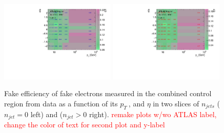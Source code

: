 \begin{figure}[htb]
        \begin{center}
        \includegraphics[width = 0.49\textwidth]{figures/Analysis/Background/njet0_FakeEfficiency3D_el_pt_eta.pdf}
        \includegraphics[width = 0.49\textwidth]{figures/Analysis/Background/njet1_FakeEfficiency3D_el_pt_eta.pdf} 
        \end{center}
    \caption{Fake efficiency of fake electrons measured in the combined control region from data as a function of its $p_{T}~$, and $\eta$ in two slices of $n_{jets}$ ($n_{jet} = 0$ left) and ($n_{jet} > 0$ right). \textcolor{red}{remake plots w/wo ATLAS label, change the color of text for second plot and y-label} \label{fig:ElecFakeEff}}
\end{figure}

